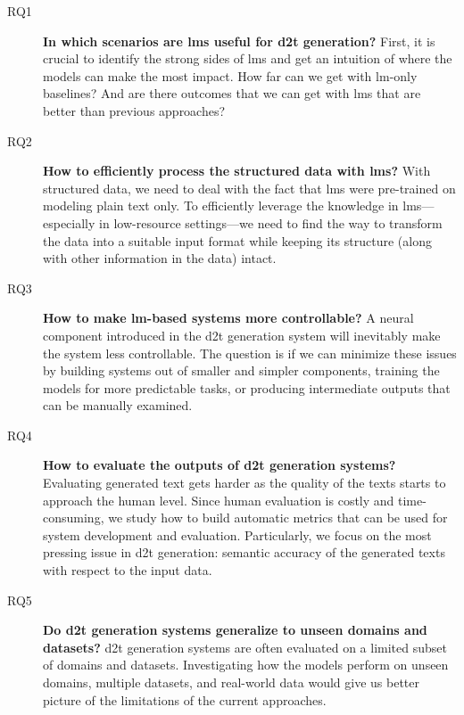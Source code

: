 \begin{description}
    \item[RQ1\label{rq:1}] \textbf{In which scenarios are \acp{lm} useful for \ac{d2t} generation?} First, it is crucial to identify the strong sides of \acp{lm} and get an intuition of where the models can make the most impact. How far can we get with \ac{lm}-only baselines? And are there outcomes that we can get with \acp{lm} that are better than previous approaches?
    \item[RQ2\label{rq:2}] \textbf{How to efficiently process the structured data with \acp{lm}?} With structured data, we need to deal with the fact that \acp{lm} were pre-trained on modeling plain text only. To efficiently leverage the knowledge in \acp{lm}---especially in low-resource settings---we need to find the way to transform the data into a suitable input format while keeping its structure (along with other information in the data) intact.
    \item[RQ3\label{rq:3}] \textbf{How to make \ac{lm}-based systems more controllable?} A neural component introduced in the \ac{d2t} generation system will inevitably make the system less controllable. The question is if we can minimize these issues by building systems out of smaller and simpler components, training the models for more predictable tasks, or producing intermediate outputs that can be manually examined.
    \item[RQ4\label{rq:4}] \textbf{How to evaluate the outputs of \ac{d2t} generation systems?} Evaluating generated text gets harder as the quality of the texts starts to approach the human level. Since human evaluation is costly and time-consuming, we study how to build automatic metrics that can be used for system development and evaluation. Particularly, we focus on the most pressing issue in \ac{d2t} generation: semantic accuracy of the generated texts with respect to the input data.
    \item[RQ5\label{rq:5}] \textbf{Do \ac{d2t} generation systems generalize to unseen domains and datasets?} \ac{d2t} generation systems are often evaluated on a limited subset of domains and datasets. Investigating how the models perform on unseen domains, multiple datasets, and real-world data would give us better picture of the limitations of the current approaches.

\end{description}



